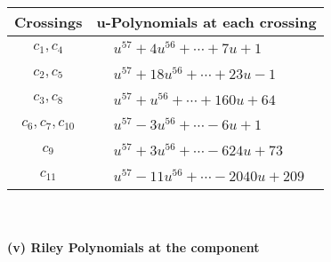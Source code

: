 \documentclass[1p]{elsarticle_modified}
\theoremstyle{definition}
\begin{document}
\begin{tabular}{m{50pt}|m{274pt}}
Crossings & \hspace{64pt}u-Polynomials at each crossing \\
\hline $$\begin{aligned}c_{1},c_{4}\end{aligned}$$&$\begin{aligned}
&u^{57}+4 u^{56}+\cdots+7 u+1
\end{aligned}$\\
\hline $$\begin{aligned}c_{2},c_{5}\end{aligned}$$&$\begin{aligned}
&u^{57}+18 u^{56}+\cdots+23 u-1
\end{aligned}$\\
\hline $$\begin{aligned}c_{3},c_{8}\end{aligned}$$&$\begin{aligned}
&u^{57}+u^{56}+\cdots+160 u+64
\end{aligned}$\\
\hline $$\begin{aligned}c_{6},c_{7},c_{10}\end{aligned}$$&$\begin{aligned}
&u^{57}-3 u^{56}+\cdots-6 u+1
\end{aligned}$\\
\hline $$\begin{aligned}c_{9}\end{aligned}$$&$\begin{aligned}
&u^{57}+3 u^{56}+\cdots-624 u+73
\end{aligned}$\\
\hline $$\begin{aligned}c_{11}\end{aligned}$$&$\begin{aligned}
&u^{57}-11 u^{56}+\cdots-2040 u+209
\end{aligned}$\\
\hline
\end{tabular}\\~\\
\newpage\renewcommand{\arraystretch}{1}
\flushleft \textbf{(v) Riley Polynomials at the component}\newline \\
\end{document}
